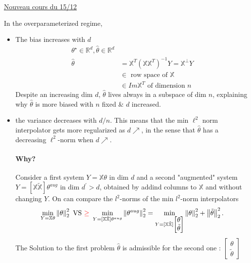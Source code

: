 \underline{Nouveau cours du 15/12} \\


\begin{note}[]
    In the overparameterized regime, \begin{itemize}
        \item The bias increases with $ d $ 
        \begin{align*}
            \theta ^\star \in \mathbb{R}^d, \hat{\theta } \in \mathbb{R}^d \\
            \hat{\theta } &= \mathbb{X} ^T (\mathbb{X} \mathbb{X} ^T)^{-1} Y = \mathbb{X} ^\perp Y \\
                &\in  \text{ row space of } \mathbb{X} \\
                &\in Im \mathbb{X}^T \text{ of dimension } n
        \end{align*}
        Despite an increasing dim $ d $, $ \hat{\theta } $ lives always in a subspace of dim $ n $, explaining why $ \hat{\theta } $ is more biased with $ n $  fixed \& $ d $ increased.
        \begin{figure}[H] %
            \centering
        \end{figure}

        \item the variance decreases with $d/n$. This means that the min $\ell ^2$ norm interpolator gets more regularized as $d \nearrow $, in the sense that $\hat{\theta }$ has a decreasing $\ell ^2$-norm when $d \nearrow $. \\
        \paragraph*{Why?}  Consider a first system $Y= \mathbb{X} \theta $ in dim $d$ and a second "augmented" system $ Y= [\mathbb{X} \tilde{\mathbb{X}}]\theta ^{aug} $ in dim $ d^\prime > d $, obtained by addind columns to $ \mathbb{X} $  and without changing $ Y $. On can compare the $ l^2 $-norms of the min $ l^2 $-norm interpolators 
        \[
            \min _{Y = \mathbb{X}\theta } \left\| \theta  \right\| _2 ^2 \text{ VS  \textcolor{red}{$ \geq $} } \min _{Y = [\mathbb{X} \tilde{\mathbb{X}} ] \theta ^{aug}} \left\| \theta ^{aug} \right\| _2 ^2 = \min _{Y = [\mathbb{X} \tilde{\mathbb{X}}] \begin{bmatrix}
                \theta \\ \tilde{\theta }
            \end{bmatrix}
            } \left\| \theta  \right\| _2 ^2 + \left\| \tilde{\theta } \right\| _2 ^2
        .\]
        The Solution to the first problem $ \hat{\theta } $ is admissible for the second one : $ \begin{bmatrix}
            \theta \\ \tilde{\theta }
        \end{bmatrix} $ 
    \end{itemize}
\end{note}

